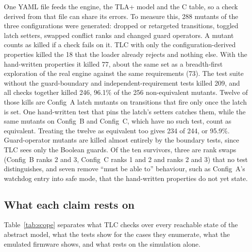\documentclass[preprint,12pt]{elsarticle}
\newcommand{\cfgA}{Config~A}
\newcommand{\cfgB}{Config~B}
\newcommand{\cfgC}{Config~C}
\begin{document}
One YAML file feeds the engine, the TLA+ model and the C table, so a check derived from that file can share its errors. To measure this, 288 mutants of the three configurations were generated: dropped or retargeted transitions, toggled latch setters, swapped conflict ranks and changed guard operators. A mutant counts as killed if a check fails on it. TLC with only the configuration-derived properties killed the 18 that the loader already rejects and nothing else. With the hand-written properties it killed 77, about the same set as a breadth-first exploration of the real engine against the same requirements (73). The test suite without the guard-boundary and independent-requirement tests killed 209, and all checks together killed 246, 96.1\% of the 256 non-equivalent mutants. Twelve of those kills are \cfgA{} latch mutants on transitions that fire only once the latch is set. One hand-written test that pins the latch's setters catches them, while the same mutants on \cfgB{} and \cfgC{}, which have no such test, count as equivalent. Treating the twelve as equivalent too gives 234 of 244, or 95.9\%. Guard-operator mutants are killed almost entirely by the boundary tests, since TLC sees only the Boolean guards. Of the ten survivors, three are rank swaps (\cfgB{} ranks 2 and 3, \cfgC{} ranks 1 and 2 and ranks 2 and 3) that no test distinguishes, and seven remove ``must be able to'' behaviour, such as \cfgA{}'s watchdog entry into safe mode, that the hand-written properties do not yet state.

\subsection{What each claim rests on}

Table~\ref{tab:scope} separates what TLC checks over every reachable state of the abstract model, what the tests show for the cases they enumerate, what the emulated firmware shows, and what rests on the simulation alone.
\end{document}
